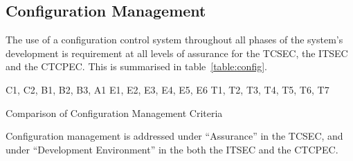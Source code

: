 
    \subsection{Configuration Management}
        The use of a configuration control system throughout all phases of the
        system's development is requirement at all levels of assurance for
        the TCSEC, the ITSEC and the CTCPEC. This is summarised in table~\ref{table:config}.
        \begin{table}[H]
        \bt
            {C1, C2, B1, B2, B3, A1}
            {E1, E2, E3, E4, E5, E6}
            {T1, T2, T3, T4, T5, T6, T7}
        \et
        \caption{Comparison of Configuration Management Criteria} \label{table:config}
        \end{table}
        Configuration management is addressed under ``Assurance'' in the TCSEC,
        and under ``Development Environment'' in the both the ITSEC and the CTCPEC.

